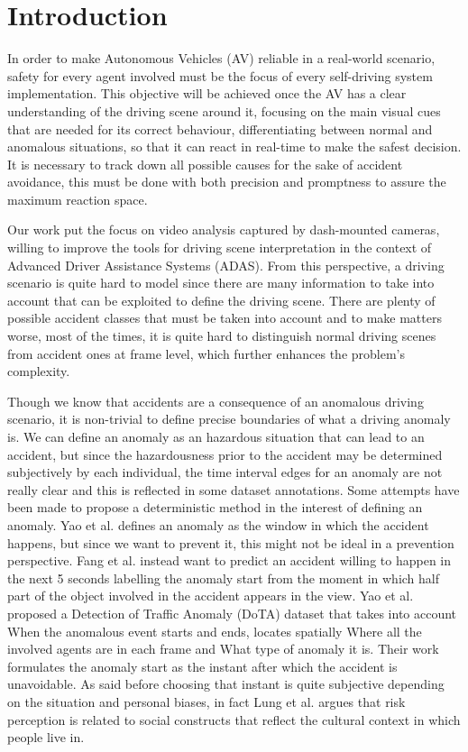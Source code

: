\section{Introduction}

In order to make Autonomous Vehicles (AV) reliable in a real-world scenario, safety for every agent involved must be the focus of every self-driving system implementation.
This objective will be achieved once the AV has a clear understanding of the driving scene around it, focusing on the main visual cues that are needed for its correct behaviour, differentiating between normal and anomalous situations, so that it can react in real-time to make the safest decision.
It is necessary to track down all possible causes for the sake of accident avoidance, this must be done with both precision and promptness to assure the maximum reaction space.

Our work put the focus on video analysis captured by dash-mounted cameras, willing to improve the tools for driving scene interpretation in the context of Advanced Driver Assistance Systems (ADAS).
From this perspective, a driving scenario is quite hard to model since there are many information to take into account that can be exploited to define the driving scene.
There are plenty of possible accident classes that must be taken into account and to make matters worse, most of the times, it is quite hard to distinguish normal driving scenes from accident ones at frame level, which further enhances the problem's complexity.

Though we know that accidents are a consequence of an anomalous driving scenario, it is non-trivial to define precise boundaries of what a driving anomaly is.
We can define an anomaly as an hazardous situation that can lead to an accident, but since the hazardousness prior to the accident may be determined subjectively by each individual, the time interval edges for an anomaly are not really clear and this is reflected in some dataset annotations.
Some attempts have been made to propose a deterministic method in the interest of defining an anomaly.
Yao et al. \cite{yao2019unsupervised} defines an anomaly as the window in which the accident happens, but since we want to prevent it, this might not be ideal in a prevention perspective.
Fang et al. \cite{fang2019dada} instead want to predict an accident willing to happen in the next 5 seconds labelling the anomaly start from the moment in which half part of the object involved in the accident appears in the view.
Yao et al. \cite{yao2020when} proposed a Detection of Traffic Anomaly (DoTA) dataset that takes into account When the anomalous event starts and ends, locates spatially Where all the involved agents are in each frame and What type of anomaly it is.
Their work formulates the anomaly start as the instant after which the accident is unavoidable.
As said before choosing that instant is quite subjective depending on the situation and personal biases, in fact Lung et al. \cite{lund2009riskperception} argues that risk perception is related to social constructs that reflect the cultural context in which people live in.

